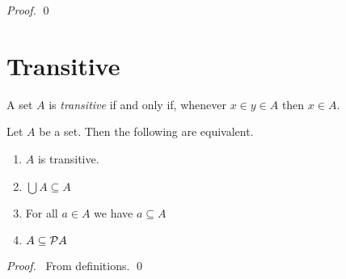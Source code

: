 \begin{proof}
    \pf
    \qed
\end{proof}

\section{Transitive}

\begin{definition}
    A set $A$ is \emph{transitive} if and only if, whenever $x \in y \in A$
    then $x \in A$.
\end{definition}

\begin{theorem}
    Let $A$ be a set. Then the following are equivalent.
    \begin{enumerate}
        \item $A$ is transitive.
        \item $\bigcup A \subseteq A$
        \item For all $a \in A$ we have $a \subseteq A$
        \item $A \subseteq \mathcal{P} A$
    \end{enumerate}
\end{theorem}

\begin{proof}
    \pf\ From definitions. \qed
\end{proof}